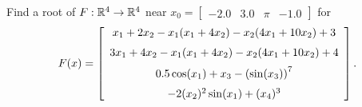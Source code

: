 \begin{example}
\label{ex:NewtonRaphson}
Find a root of $F:\mathbb R^4 \to \mathbb R^4$ near $x_0=\left[\begin{array}{cccc} -2.0 & 3.0 & \pi &-1.0\end{array} \right]$ for
$$
F(x)=\left[\begin{array}{c}
   x_1 + 2 x_2 - x_1 (x_1 + 4 x_2) - x_2 (4 x_1 + 10 x_2) + 3 \medskip \\
 3 x_1 + 4 x_2 - x_1 (x_1 + 4 x_2) - x_2 (4 x_1 + 10 x_2) + 4  \medskip\\
                                0.5 \cos(x_1) + x_3 -\left( \sin(x_3) \right)^7  \medskip\\
                              -  2(x_2)^2  \sin(x_1) + (x_4)^3
\end{array} \right].
$$

\end{example}

